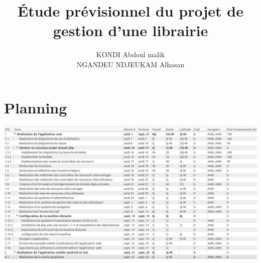 \documentclass[12pt,a4paper]{article}
\author{KONDI Abdoul malik \\ NGANDEU NDJEUKAM Alhasan}
\title{Étude prévisionnel du projet de gestion d'une librairie}
\begin{document}
\maketitle
\tableofcontents
\newpage

\section{Planning}

\begin{center}
\includegraphics[scale=0.43]{images/taches.png}
\end{center}

\newpage
\end{document}
